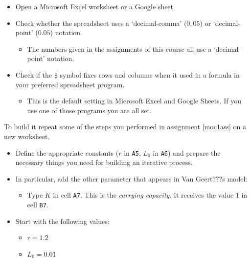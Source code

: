 \documentclass[]{book}
\providecommand{\tightlist}{%
  \setlength{\itemsep}{0pt}\setlength{\parskip}{0pt}}
\begin{document}
\begin{itemize}
\tightlist
\item
  Open a Microsoft Excel worksheet or a
  \href{https://www.google.com/docs/about/}{Google sheet}
\item
  Check whether the spreadsheet uses a `decimal-comma' (\(0,05\)) or
  `decimal-point' (\(0.05\)) notation.

  \begin{itemize}
  \tightlist
  \item
    The numbers given in the assignments of this course all use a
    `decimal-point' notation.
  \end{itemize}
\item
  Check if the \texttt{\$} symbol fixes rows and columns when it used in
  a formula in your preferred spreadsheet program.

  \begin{itemize}
  \tightlist
  \item
    This is the default setting in Microsoft Excel and Google Sheets. If
    you use one of those programs you are all set.
  \end{itemize}
\end{itemize}

To build it repeat some of the steps you performed in assignment
\ref{moc1ass} on a new worksheet.

\begin{itemize}
\tightlist
\item
  Define the appropriate constants (\(r\) in \texttt{A5}, \(L_0\) in
  \texttt{A6}) and prepare the necessary things you need for building an
  iterative process.
\item
  In particular, add the other parameter that appears in Van Geert???s
  model:

  \begin{itemize}
  \tightlist
  \item
    Type \(K\) in cell \texttt{A7}. This is the \emph{carrying
    capacity}. It receives the value \(1\) in cell \texttt{B7}.
  \end{itemize}
\item
  Start with the following values:

  \begin{itemize}
  \tightlist
  \item
    \(r = 1.2\)
  \item
    \(L_0 = 0.01\)
  \end{itemize}
\end{itemize}
\end{document}
